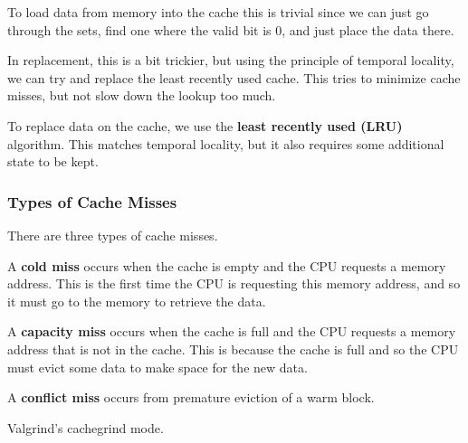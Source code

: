     \begin{theorem}[Placement]
      To load data from memory into the cache this is trivial since we can just go through the sets, find one where the valid bit is $0$, and just place the data there.  
    \end{theorem}

    In replacement, this is a bit trickier, but using the principle of temporal locality, we can try and replace the least recently used cache. This tries to minimize cache misses, but not slow down the lookup too much. 

    \begin{theorem}[Replacement]
      To replace data on the cache, we use the \textbf{least recently used (LRU)} algorithm. This matches temporal locality, but it also requires some additional state to be kept. 
    \end{theorem}

  \subsubsection{Types of Cache Misses} 

    There are three types of cache misses. 

    \begin{definition}
      A \textbf{cold miss} occurs when the cache is empty and the CPU requests a memory address. This is the first time the CPU is requesting this memory address, and so it must go to the memory to retrieve the data.
    \end{definition}
    
    \begin{definition}
      A \textbf{capacity miss} occurs when the cache is full and the CPU requests a memory address that is not in the cache. This is because the cache is full and so the CPU must evict some data to make space for the new data.
    \end{definition}

    \begin{definition}
      A \textbf{conflict miss} occurs from premature eviction of a warm block. 
    \end{definition}

  Valgrind's cachegrind mode. 

